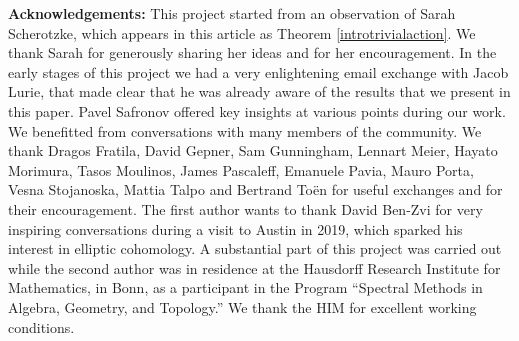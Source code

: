 \documentclass[11pt,letterpaper]{amsart}
\begin{document}
%
%




{\bf Acknowledgements:} 
This project started from an observation of Sarah Scherotzke, which appears in this article as Theorem \ref{introtrivialaction}. We thank Sarah for  generously sharing her ideas and for her encouragement. In the early stages of  this project we had a very enlightening email exchange with Jacob Lurie,  that made clear that he was already aware of the results that we present in this paper. Pavel Safronov offered key insights at various points during our work. We benefitted from conversations with many members of the community.  We thank Dragos Fratila, David Gepner, Sam Gunningham, Lennart Meier, Hayato Morimura, Tasos Moulinos, James Pascaleff, Emanuele Pavia, Mauro Porta,  Vesna Stojanoska, Mattia Talpo and Bertrand To\"en for useful exchanges and for their encouragement. The first author wants to thank  David Ben-Zvi for very  inspiring conversations during a visit to Austin in 2019, which sparked his interest in elliptic cohomology.   A substantial part of this project was carried out while the second author was in residence at the Hausdorff Research Institute for Mathematics, in Bonn, as a participant in the Program ``Spectral Methods in Algebra, Geometry, and Topology.'' We  thank the HIM for excellent working conditions.  
\end{document}
